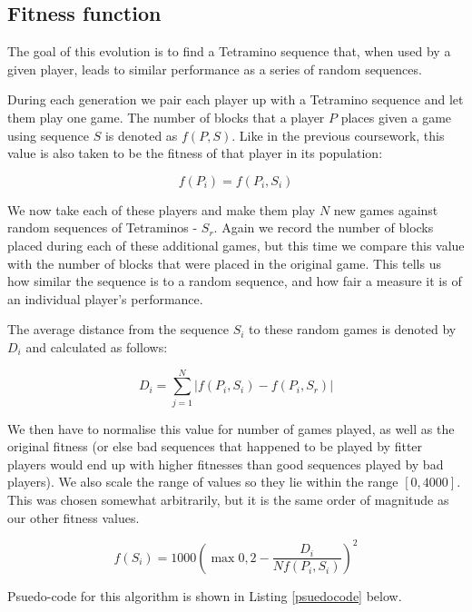 \documentclass[a4paper,11pt]{article}
\begin{document}
\subsection{Fitness function}

The goal of this evolution is to find a Tetramino sequence that, when used by
a given player, leads to similar performance as a series of random sequences.

During each generation we pair each player up with a Tetramino sequence and let
them play one game.
The number of blocks that a player $P$ places given a game using sequence $S$
is denoted as $f(P, S)$.
Like in the previous coursework, this value is also taken to be the fitness of
that player in its population:

\begin{equation}
  f(P_i) = f(P_i, S_i)
\end{equation}

We now take each of these players and make them play $N$ new games against
random sequences of Tetraminos - $S_r$.
Again we record the number of blocks placed during each of these additional
games, but this time we compare this value with the number of blocks that were
placed in the original game.
This tells us how similar the sequence is to a random sequence, and how fair a
measure it is of an individual player's performance.

The average distance from the sequence $S_i$ to these random games is denoted
by $D_i$ and calculated as follows:

\begin {equation}
  D_i = \sum_{j=1}^{N} \left| f\left( P_i, S_i\right) - f\left( P_i, S_r \right) \right|
\end{equation}

We then have to normalise this value for number of games played, as well as the
original fitness (or else bad sequences that happened to be played by fitter
players would end up with higher fitnesses than good sequences played by bad
players).
We also scale the range of values so they lie within the range $[0, 4000]$.
This was chosen somewhat arbitrarily, but it is the same order of magnitude
as our other fitness values.

\begin{equation}
  f(S_i) = 1000 \left( \max 0, 2 - \frac{D_i}{ N f\left( P_i, S_i\right) } \right)^2
\end {equation}

Psuedo-code for this algorithm is shown in Listing \ref{psuedocode} below.
\end{document}
